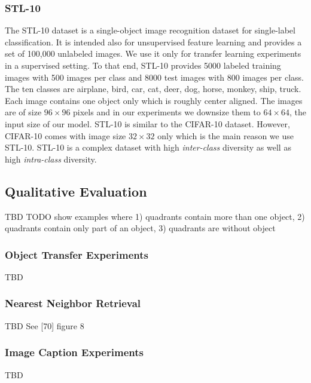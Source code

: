 \documentclass[12pt,a4paper]{article}
\begin{document}
\subsubsection{STL-10}
The STL-10 \cite{singleLayerNetworks} dataset is a single-object image recognition dataset for single-label classification. It is intended also for unsupervised feature learning and provides a set of 100,000 unlabeled images. We use it only for transfer learning experiments in a supervised setting. To that end, STL-10 provides 5000 labeled training images with 500 images per class and 8000 test images with 800 images per class. The ten classes are airplane, bird, car, cat, deer, dog, horse, monkey, ship, truck. Each image contains one object only which is roughly center aligned. The images are of size $96 \times 96$ pixels and in our experiments we downsize them to $64 \times 64$, the input size of our model. STL-10 is similar to the CIFAR-10 dataset. However, CIFAR-10 comes with image size $32 \times 32$ only which is the main reason we use STL-10. STL-10 is a complex dataset with high \textit{inter-class} diversity as well as high \textit{intra-class} diversity.


\subsection{Qualitative Evaluation}
TBD
TODO show examples where 1) quadrants contain more than one object, 2) quadrants contain only part of an object, 3) quadrants are without object

\subsubsection{Object Transfer Experiments}
TBD

\subsubsection{Nearest Neighbor Retrieval}
TBD
See [70] figure 8

\subsubsection{Image Caption Experiments}
TBD
\end{document}
